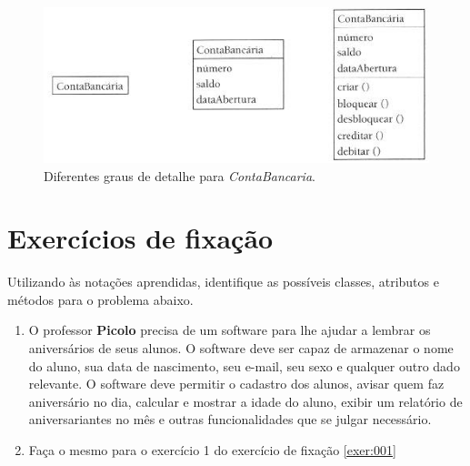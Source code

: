 \begin{figure}[H]
	\centering
	\includegraphics[scale=0.5]{imagens/exemplo-classe-conta-bancaria.png}
	\caption{Diferentes graus de detalhe para \textit{ContaBancaria}.}
	\label{fig:exemplo-classe-conta-bancaria}
\end{figure}

\section{Exercícios de fixação}

Utilizando às notações aprendidas, identifique as possíveis classes, atributos e métodos para o problema abaixo.

\begin{enumerate}
	\item O professor \textbf{Picolo} precisa de um software para lhe ajudar a lembrar os aniversários de seus alunos. O software deve ser capaz de armazenar o nome do aluno, sua data de nascimento, seu e-mail, seu sexo e qualquer outro dado relevante. O software deve permitir o cadastro dos alunos, avisar quem faz aniversário no dia, calcular e mostrar a idade do aluno, exibir um relatório de aniversariantes no mês e outras funcionalidades que se julgar necessário.
	\item Faça o mesmo para o exercício 1 do exercício de fixação \ref{exer:001}
\end{enumerate}